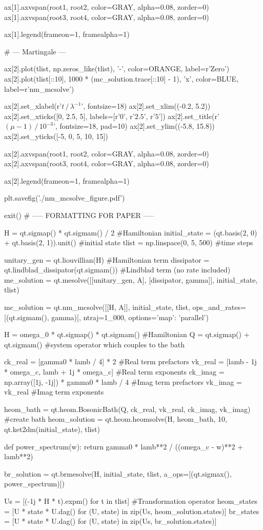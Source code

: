 ax[1].axvspan(root1, root2, color=GRAY, alpha=0.08, zorder=0)
ax[1].axvspan(root3, root4, color=GRAY, alpha=0.08, zorder=0)

ax[1].legend(frameon=1, framealpha=1)

# --- Martingale ---

ax[2].plot(tlist, np.zeros_like(tlist), '-', color=ORANGE, label=r'Zero')
ax[2].plot(tlist[::10], 1000 * (mc_solution.trace[::10] - 1), 'x', color=BLUE, label=r'nm_mcsolve')

ax[2].set_xlabel(r'$t\, /\, \lambda^{-1}$', fontsize=18)
ax[2].set_xlim((-0.2, 5.2))
ax[2].set_xticks([0, 2.5, 5], labels=[r'$0$', r'$2.5$', r'$5$'])
ax[2].set_title(r'$(\mu - 1)\, /\, 10^{-3}$', fontsize=18, pad=10)
ax[2].set_ylim((-5.8, 15.8))
ax[2].set_yticks([-5, 0, 5, 10, 15])

ax[2].axvspan(root1, root2, color=GRAY, alpha=0.08, zorder=0)
ax[2].axvspan(root3, root4, color=GRAY, alpha=0.08, zorder=0)

ax[2].legend(frameon=1, framealpha=1)

plt.savefig('./nm_mcsolve_figure.pdf')



exit()
# ----- FORMATTING FOR PAPER -----

H = qt.sigmap() * qt.sigmam() / 2 #Hamiltonian 
initial_state = (qt.basis(2, 0) + qt.basis(2, 1)).unit()  #initial state
tlist = np.linspace(0, 5, 500) #time steps



unitary_gen = qt.liouvillian(H) #Hamiltonian term
dissipator = qt.lindblad_dissipator(qt.sigmam()) #Lindblad term (no rate included)
me_solution = qt.mesolve([[unitary_gen, A], [dissipator, gamma]], initial_state, tlist)



mc_solution = qt.nm_mcsolve([[H, A]], initial_state, tlist,
                            ops_and_rates=[(qt.sigmam(), gamma)],
                            ntraj=1_000, options={'map': 'parallel'})



H = omega_0 * qt.sigmap() * qt.sigmam() #Hamiltonian
Q = qt.sigmap() + qt.sigmam() #system operator which couples to the bath



ck_real = [gamma0 * lamb / 4] * 2 #Real term prefactors
vk_real = [lamb - 1j * omega_c, lamb + 1j * omega_c] #Real term exponents
ck_imag = np.array([1j, -1j]) * gamma0 * lamb / 4 #Imag term prefactors
vk_imag = vk_real #Imag term exponents

heom_bath = qt.heom.BosonicBath(Q, ck_real, vk_real, ck_imag, vk_imag) #create bath
heom_solution = qt.heom.heomsolve(H, heom_bath, 10, qt.ket2dm(initial_state), tlist)



def power_spectrum(w):
    return gamma0 * lamb**2 / ((omega_c - w)**2 + lamb**2)

br_solution = qt.brmesolve(H, initial_state, tlist, a_ops=[(qt.sigmax(), power_spectrum)])



Us = [(-1j * H * t).expm() for t in tlist] #Transformation operator
heom_states = [U * state * U.dag() for (U, state) in zip(Us, heom_solution.states)]
br_states = [U * state * U.dag() for (U, state) in zip(Us, br_solution.states)]
